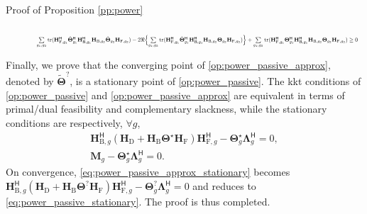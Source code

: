 \documentclass[journal]{IEEEtran}
\DeclareMathOperator{\tr}{tr}
\begin{document}
\begin{appendix}
\begin{subsection}{Proof of Proposition \ref{pp:power}}
\begin{figure}
\begin{equation}
{				}
			\end{equation}
			\begin{equation}
				\label{iq:nonnegative_norm_square}
				\resizebox{0.95\textwidth}{!}{
					$\sum\limits_{g_1,g_2} \tr(\mathbf{H}_{\mathrm{F},g_1}^\mathsf{H} \tilde{\mathbf{\Theta}}_{g_1}^\mathsf{H} \mathbf{H}_{\mathrm{B},g_1}^\mathsf{H} \mathbf{H}_{\mathrm{B},g_2} \tilde{\mathbf{\Theta}}_{g_2} \mathbf{H}_{\mathrm{F},g_2}) - 2 \Re \Bigl\{\sum\limits_{g_1,g_2} \tr(\mathbf{H}_{\mathrm{F},g_1}^\mathsf{H} \tilde{\mathbf{\Theta}}_{g_1}^\mathsf{H} \mathbf{H}_{\mathrm{B},g_1}^\mathsf{H} \mathbf{H}_{\mathrm{B},g_2} \mathbf{\Theta}_{g_2} \mathbf{H}_{\mathrm{F},g_2})\Bigr\} + \sum\limits_{g_1,g_2} \tr(\mathbf{H}_{\mathrm{F},g_1}^\mathsf{H} {\mathbf{\Theta}}_{g_1}^\mathsf{H} \mathbf{H}_{\mathrm{B},g_1}^\mathsf{H} \mathbf{H}_{\mathrm{B},g_2} {\mathbf{\Theta}}_{g_2} \mathbf{H}_{\mathrm{F},g_2}) \ge 0$
				}
			\end{equation}
			\hrulefill
		\end{figure}

		Finally, we prove that the converging point of \eqref{op:power_passive_approx}, denoted by $\tilde{\mathbf{\Theta}}^?$, is a stationary point of \eqref{op:power_passive}.
		The \gls{kkt} conditions of \eqref{op:power_passive} and \eqref{op:power_passive_approx} are equivalent in terms of primal/dual feasibility and complementary slackness, while the stationary conditions are respectively, $\forall g$,
		\begin{gather}
			\mathbf{H}_{\mathrm{B},g}^\mathsf{H} (\mathbf{H}_\mathrm{D} + \mathbf{H}_\mathrm{B} \mathbf{\Theta}^\star \mathbf{H}_\mathrm{F}) \mathbf{H}_{\mathrm{F},g}^\mathsf{H} - \mathbf{\Theta}_g^\star \mathbf{\Lambda}_g^\mathsf{H} = 0,\label{eq:power_passive_stationary}\\
			\mathbf{M}_g - \mathbf{\Theta}_g^\star \mathbf{\Lambda}_g^\mathsf{H} = 0.\label{eq:power_passive_approx_stationary}
		\end{gather}
		On convergence, \eqref{eq:power_passive_approx_stationary} becomes $\mathbf{H}_{\mathrm{B},g}^\mathsf{H} (\mathbf{H}_\mathrm{D} + \mathbf{H}_\mathrm{B} \mathbf{\Theta}^? \mathbf{H}_\mathrm{F}) \mathbf{H}_{\mathrm{F},g}^\mathsf{H} - \mathbf{\Theta}_g^? \mathbf{\Lambda}_g^\mathsf{H} = 0$ and reduces to \eqref{eq:power_passive_stationary}.
		The proof is thus completed.
	\end{subsection}



\end{appendix}
\end{document}
